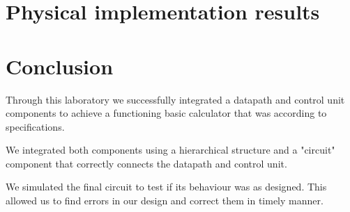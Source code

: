 \documentclass[12pt]{article}
\begin{document}
\section{Physical implementation results}

\section{Conclusion}

Through this laboratory we successfully integrated a datapath and control unit components to achieve a functioning basic calculator that was according to specifications.

We integrated both components using a hierarchical structure and a "circuit" component that correctly connects the datapath and control unit.

We simulated the final circuit to test if its behaviour was as designed. This allowed us to find errors in our design and correct them in timely manner.
\end{document}
